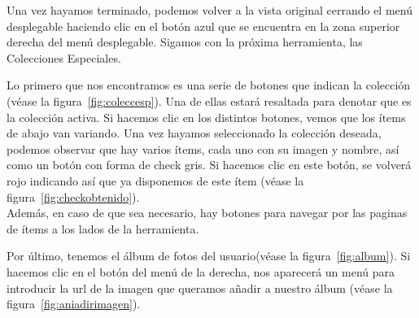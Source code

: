 \clearpage

Una vez hayamos terminado, podemos volver a la vista original cerrando el menú desplegable haciendo clic en el botón azul que se encuentra en la zona superior derecha del menú desplegable. Sigamos con la próxima herramienta, las Colecciones Especiales.\\


Lo primero que nos encontramos es una serie de botones que indican la colección {(v\'ease la figura~\ref{fig:coleccesp})}. Una de ellas estará resaltada para denotar que es la colección activa. Si hacemos clic en los distintos botones, vemos que los ítems de abajo van variando. Una vez hayamos seleccionado la colección deseada, podemos observar que hay varios ítems, cada uno con su imagen y nombre, así como un botón con forma de check gris. Si hacemos clic en este botón, se volverá rojo indicando así que ya disponemos de este ítem {(v\'ease la figura~\ref{fig:checkobtenido})}.\\

Además, en caso de que sea necesario, hay botones para navegar por las paginas de ítems a los lados de la herramienta.\\


\clearpage

Por último, tenemos el álbum de fotos del usuario{(v\'ease la figura~\ref{fig:album})}. Si hacemos clic en el botón del menú de la derecha, nos aparecerá un menú para introducir la url de la imagen que queramos añadir a nuestro álbum {(v\'ease la figura~\ref{fig:aniadirimagen})}.\\


